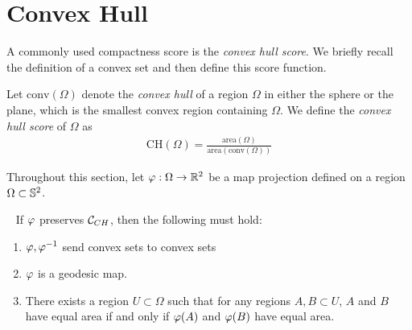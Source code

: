 \section{Convex Hull}\label{sec:ch}
A commonly used compactness score is the \textit{convex hull
score}.  We briefly recall the definition of a convex set and then
define this score function.

\begin{definition}
  Let $\mathrm{conv}(\Omega)$ denote the \textit{convex hull} of
  a region $\Omega$ in either the sphere or the plane, which is the
  smallest convex region containing $\Omega$. We define the 
  \textit{convex hull score} of $\Omega$ as 
  \begin{align*}
    \mathrm{CH}(\Omega)=
    \frac{\mathrm{area}(\Omega)}{\mathrm{area}(\mathrm{conv}(\Omega))}
  \end{align*}
\end{definition}
Throughout this section, let $\varphi:\Omega \to \mathbb{R}^2$ be a 
map projection defined on a region $\Omega\subset \mathbb{S}^2$.
\begin{lemma}~\label{lem:CH_prep}
  If $\varphi$ preserves $\mathcal{C}_{CH}$, then the following must 
  hold:
  \begin{enumerate}
    \item $\varphi,\varphi^{-1}$ send convex sets to convex sets
    \item $\varphi$ is a geodesic map.
    \item There exists a region $U\subset \Omega$ 
      such that for any regions $A,B\subset U$, 
      $A$ and $B$ have equal area 
      if and only if $\varphi(A)$ and $\varphi(B)$ have equal 
      area.
  \end{enumerate}
\end{lemma}
